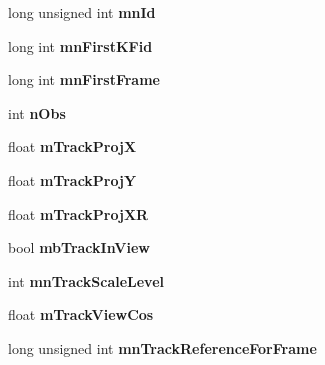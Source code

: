\begin{DoxyCompactItemize}
\item 
\mbox{\label{classObjectPoint_ab32d8a7ef63652fbfb27ceadcb36eb98}} 
long unsigned int {\bfseries mn\+Id}
\item 
\mbox{\label{classObjectPoint_a074258ee4866dd4b014d28f8197d2614}} 
long int {\bfseries mn\+First\+K\+Fid}
\item 
\mbox{\label{classObjectPoint_a4f6299bef9f8413e08fd32ee0cb31ad9}} 
long int {\bfseries mn\+First\+Frame}
\item 
\mbox{\label{classObjectPoint_a8e952dbedec3c084e3f586939c8d0fd3}} 
int {\bfseries n\+Obs}
\item 
\mbox{\label{classObjectPoint_ada7fece10c2e93aeec07f8ff5036ebcc}} 
float {\bfseries m\+Track\+ProjX}
\item 
\mbox{\label{classObjectPoint_ad2e82e1e25f4dbf77f130f80cc199403}} 
float {\bfseries m\+Track\+ProjY}
\item 
\mbox{\label{classObjectPoint_a6d05e2d44225ff46f59d4f303163843f}} 
float {\bfseries m\+Track\+Proj\+XR}
\item 
\mbox{\label{classObjectPoint_abbef8a45bb5cf3af4f29dd414f7ab1a6}} 
bool {\bfseries mb\+Track\+In\+View}
\item 
\mbox{\label{classObjectPoint_a2d747f3f60875157e8e839d11958240d}} 
int {\bfseries mn\+Track\+Scale\+Level}
\item 
\mbox{\label{classObjectPoint_a93195b2f7849f39b7966131dab159172}} 
float {\bfseries m\+Track\+View\+Cos}
\item 
\mbox{\label{classObjectPoint_a7180529cb82f2e30273f547200c4ff25}} 
long unsigned int {\bfseries mn\+Track\+Reference\+For\+Frame}
\item 
\mbox{\label{classObjectPoint_a8741220bce6b1f78c3d1f6d46bba996f}} 

\end{DoxyCompactItemize}
